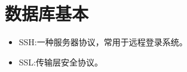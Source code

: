 \documentclass[11pt]{article}
\begin{document}
\section{数据库基本}
\begin{itemize}
\item SSH:一种服务器协议，常用于远程登录系统。
\item SSL:传输层安全协议。
\end{itemize}
\end{document}
